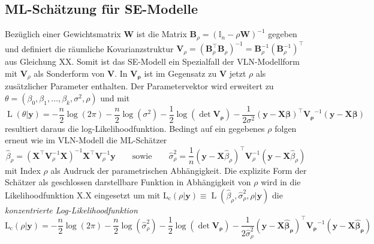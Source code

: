 \subsection{ML-Schätzung für SE-Modelle}
Bezüglich einer Gewichtsmatrix $\mathbf{W}$ ist die Matrix $\mathbf{B}_{\rho}=(\mathds{I}_{n} - \rho \mathbf{W})^{-1}$ gegeben und 
definiert die räumliche Kovarianzstruktur $\mathbf{V}_{\rho}=\left(\mathbf{B}_{\rho}^{\top} \mathbf{B}_{\rho} \right)^{-1} 
=\mathbf{B}_{\rho}^{-1} \left(\mathbf{B}_{\rho}^{-1}\right)^{\top}$ aus Gleichung XX. 
Somit ist das SE-Modell ein Spezialfall der VLN-Modellform mit $\mathbf{V}_{\rho}$ als Sonderform von $\mathbf{V}$. 
In $\mathbf{V_{\rho}}$ ist im Gegensatz zu $\mathbf{V}$ jetzt $\rho$ als zusätzlicher Parameter enthalten. Der Parametervektor wird erweitert zu 
$\theta=(\beta_{0},\beta_{1},\ldots,\beta_{k},\sigma^{2},\rho)$ und mit
\begin{equation*}
    \operatorname{L}(\theta|\mathbf{y})= -\frac{n}{2} \log(2\pi) -\frac{n}{2} \log(\sigma^{2}) -\frac{1}{2} \log(\det \mathbf{V_{\rho}} )
    -\frac{1}{2\sigma^{2}} \left( \mathbf{y-X\beta} \right)^{\top} \mathbf{V_{\rho}}^{-1} \left( \mathbf{y-X\beta} \right)
\end{equation*}
resultiert daraus die log-Likelihoodfunktion. Bedingt auf ein gegebenes $\rho$ folgen erneut wie im VLN-Modell 
die ML-Schätzer 
\begin{equation*}
    \hat{\beta}_{\rho} = \left( \mathbf{X}^{\top} \mathbf{V}_{\rho}^{-1} \mathbf{X} \right)^{-1}
    \mathbf{X}^{\top} \mathbf{V}_{\rho}^{-1} \mathbf{y} 
    \qquad \text{sowie} \qquad
    \hat{\sigma}_{\rho}^{2} = \frac{1}{n} \left( \mathbf{y} - \mathbf{X} \hat{\beta}_{\rho} \right)^{\top} 
    \mathbf{V}_{\rho}^{-1} \left( \mathbf{y}- \mathbf{X} \hat{\beta}_{\rho} \right)
\end{equation*}
mit Index $\rho$ als Audruck der parametrischen Abhängigkeit. 
Die explizite Form der Schätzer als geschlossen darstellbare Funktion in Abhängigkeit von $\rho$ wird in 
die Likelihoodfunktion X.X eingesetzt um mit 
$ \operatorname{L_{c}}(\rho|\mathbf{y}) \equiv \operatorname{L}(\hat{\beta}_{\rho},\hat{\sigma}_{\rho}^{2},\rho|\mathbf{y}) $ 
die \emph{konzentrierte Log-Likelihoodfunktion} 
\begin{equation*}
    \operatorname{L_{c}}(\rho|\mathbf{y})= -\frac{n}{2} \log(2\pi) -\frac{n}{2} \log(\hat{\sigma}_{\rho}^{2}) -\frac{1}{2} \log(\det \mathbf{V_{\rho}} )
    -\frac{1}{2 \hat{\sigma}_{\rho}^{2}} \left( \mathbf{y-X \hat{\beta}_{\rho}} \right)^{\top} \mathbf{V_{\rho}}^{-1} \left( \mathbf{y-X \hat{\beta}_{\rho}} \right)
\end{equation*}
